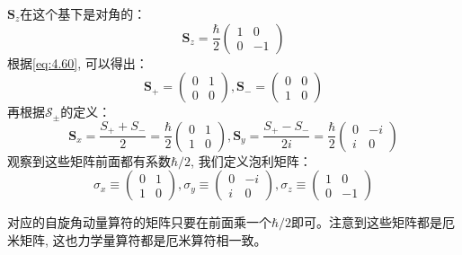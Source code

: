 \documentclass[a4paper,zihao=-4,linespread=1]{ctexrep}
\newenvironment{lequation}{\large\begin{equation}}{\end{equation}}
\begin{document}
    $\mathbf{S}_z$在这个基下是对角的：
    \begin{equation}
    \mathbf{S}_z = \frac{\hbar }{2} \begin{pmatrix}
        1& 0\\
        0& -1
    \end{pmatrix}
    \end{equation}
    根据\ref{eq:4.60}, 可以得出：
    \begin{equation}
        \mathbf{S}_+=\begin{pmatrix}
            0&1\\
            0&0
        \end{pmatrix},
        \mathbf{S}_-=\begin{pmatrix}
            0&0\\
            1&0
        \end{pmatrix}
    \end{equation}
    再根据$\mathcal{S}_\pm$的定义：
    \begin{equation}
        \mathbf{S}_x=\frac{S_++S_-}{2}=\frac{\hbar}{2}
        \begin{pmatrix}
            0&1\\
            1&0
        \end{pmatrix},
        \mathbf{S}_y=\frac{S_+-S_-}{2i}=\frac{\hbar}{2}
        \begin{pmatrix}
            0&-i\\
            i&0
        \end{pmatrix}
    \end{equation}
    观察到这些矩阵前面都有系数$\hbar/2$, 我们定义泡利矩阵：
    \begin{lequation}
        \boxed{
            \sigma_x\equiv\begin{pmatrix}
                0&1\\
                1&0
            \end{pmatrix},
            \sigma_y\equiv\begin{pmatrix}
                0&-i\\
                i&0
            \end{pmatrix},
            \sigma_z\equiv\begin{pmatrix}
                1&0\\
                0&-1
            \end{pmatrix}
        }
    \end{lequation}
    
    对应的自旋角动量算符的矩阵只要在前面乘一个$\hbar/2$即可。注意到这些矩阵都是厄米矩阵, 这也力学量算符都是厄米算符相一致。
    
\end{document}

